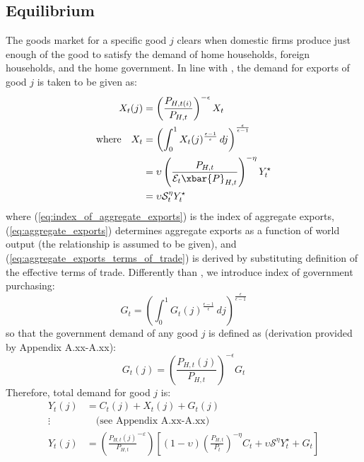 \subsection{Equilibrium}
The goods market for a specific good $j$ clears when domestic firms produce just enough of the good to satisfy the demand of home households, foreign households, and the home government. In line with \textcite{jordigal_2015_monetary}, the demand for exports of good $j$ is taken to be given as:
\begin{align}
    X_t(j) &= \left(\frac{P_{H,t(i)}}{P_{H,t}}\right)^{-\epsilon} X_t\\
    \text{where} \quad X_t &= \left( \int_{0}^{1} X_t(j)^{\frac{\epsilon-1}{\epsilon}} \, dj\right)^{\frac{\epsilon}{\epsilon-1}} \label{eq:index_of_aggregate_exports}\\
    & =\upsilon\left( \frac{P_{H,t}}{\mathcal{E}_t \xbar{P}_{H,t}}\right)^{-\eta}Y^\star_t \label{eq:aggregate_exports}\\
    & = \upsilon \mathcal{S}_t^{\eta}Y^\star_t \label{eq:aggregate_exports_terms_of_trade}
\end{align} 
where (\ref{eq:index_of_aggregate_exports}) is the index of aggregate exports, (\ref{eq:aggregate_exports}) determines aggregate exports as a function of world output (the relationship is assumed to be given), and (\ref{eq:aggregate_exports_terms_of_trade}) is derived by substituting definition of the effective terms of trade. Differently than \textcite{jordigal_2015_monetary}, we introduce index of government purchasing:
\begin{equation}
    G_t = \left( \int_{0}^{1} {G_t(j)}^{\frac{\epsilon-1}{\epsilon}} \, dj\right)^{\frac{\epsilon}{\epsilon-1}}
\end{equation}
so that the government demand of any good $j$ is defined as (derivation provided by Appendix A.xx-A.xx):
\begin{equation}
    G_t(j) = \left( \frac{P_{H,t}(j)}{P_{H,t}} \right)^{-\epsilon} G_t
\end{equation}
Therefore, total demand for good $j$ is:
\begin{align}
    Y_t(j) &= C_t(j) + X_t(j) + G_t(j) \label{eq:demand_for_one_good}\\
    \vdots & \quad \text{(see Appendix A.xx-A.xx)} \\
    Y_t(j) &= \left(\frac{P_{H,t}(j)}{P_{H,t}}^{-\varepsilon}\right) \left[ (1-\upsilon)\left(\frac{P_{H,t}}{P_t}\right)^{-\eta}C_t + \upsilon \mathcal{S}^\eta Y^\star_t + G_t\right]
\end{align}
